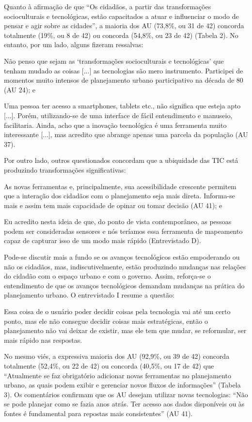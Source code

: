 \documentclass{article}
\begin{document}
Quanto à afirmação de que “Os cidadãos, a partir das transformações
socioculturais e tecnológicas, estão capacitados a atuar e influenciar o
modo de pensar e agir sobre as cidades”, a maioria dos AU (73,8\%,
ou 31 de 42) concorda totalmente (19\%, ou 8 de 42) ou concorda (54,8\%, ou 23
de
42) (Tabela 2). No entanto, por um lado,
alguns fizeram ressalvas:

Não penso que sejam as ‘transformações socioculturais e tecnológicas’ que
tenham mudado as coisas [...] as tecnologias são mero instrumento.
Participei de momentos muito intensos de planejamento urbano participativo
na década de 80 (AU 24); e

Uma pessoa ter acesso a smartphones, tablets etc., não significa que esteja
apto [...]. Porém, utilizando-se de uma interface de fácil
entendimento e manuseio, facilitaria. Ainda, acho que a inovação tecnológica
é uma ferramenta muito interessante [...], mas acredito que
abrange apenas uma parcela da população (AU 37).

Por outro lado, outros questionados concordam que a ubiquidade das TIC está
produzindo transformações significativas:

As novas ferramentas e, principalmente, sua acessibilidade crescente permitem
que a interação dos cidadãos com o planejamento seja mais direta. Informa-se
mais e assim tem mais capacidade de opinar ou tomar decisão (AU 41);
e

Eu acredito nesta ideia de que, do ponto de vista contemporâneo, as pessoas
podem ser consideradas sensores e nós teríamos essa ferramenta de mapeamento
capaz de capturar isso de um modo mais rápido (Entrevistado
D).

Pode-se discutir mais a fundo se os avanços tecnológicos estão empoderando ou
não
os cidadãos, mas, indiscutivelmente, estão produzindo mudanças nas relações do
cidadão com o espaço urbano e com o governo. Assim, reforça-se o entendimento de
que os avanços tecnológicos demandam mudanças na prática do planejamento urbano.
O entrevistado I resume a questão:

Essa coisa de o usuário poder decidir coisas pela tecnologia vai até um certo
ponto, mas ele não consegue decidir coisas mais estratégicas, então o
planejamento não vai deixar de existir, mas ele tem que mudar, se
reformular, ser mais rápido nas respostas.

No mesmo viés, a expressiva maioria dos AU (92,9\%, ou 39 de 42) concorda
totalmente (52,4\%, ou 22 de 42) ou concorda (40,5\%, ou 17 de 42) que
“Atualmente se faz obrigatório adicionar novas ferramentas no
planejamento urbano, as quais podem exibir e gerenciar novos fluxos de
informações” (Tabela 3). Os
comentários confirmam que os AU desejam utilizar novas tecnologias: “Não
se pode planejar como se fazia anos atrás. Ter acesso aos dados disponíveis
ou às fontes é fundamental para repostas mais consistentes” (AU
41).
\end{document}
